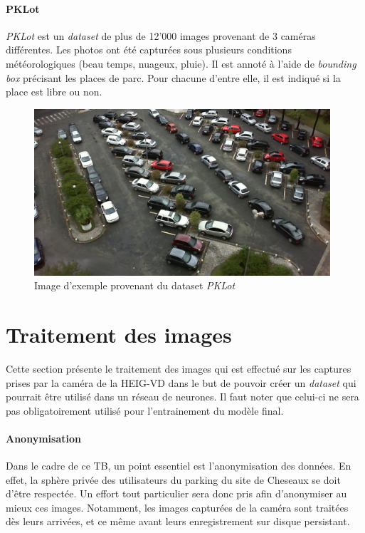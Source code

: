 \paragraph{PKLot}
\textit{PKLot} est un \textit{dataset} de plus de 12'000 images provenant de 3 caméras différentes. Les photos ont été capturées sous plusieurs conditions météorologiques (beau temps, nuageux, pluie). Il est annoté à l'aide de \textit{bounding box} précisant les places de parc. Pour chacune d'entre elle, il est indiqué si la place est libre ou non. 

\begin{figure}[ht]
    \includegraphics[width=110mm]{img/conception/pklot_park.jpg}
    \centering
    \caption{Image d'exemple provenant du dataset \textit{PKLot}}
\end{figure}

\section{Traitement des images}\label{conception.traitement}
Cette section présente le traitement des images qui est effectué sur les captures prises par la caméra de la HEIG-VD dans le but de pouvoir créer un \textit{dataset} qui pourrait être utilisé dans un réseau de neurones. Il faut noter que celui-ci ne sera pas obligatoirement utilisé pour l'entrainement du modèle final.

\paragraph{Anonymisation}
Dans le cadre de ce TB, un point essentiel est l'anonymisation des données. En effet, la sphère privée des utilisateurs du parking du site de Cheseaux se doit d'être respectée. Un effort tout particulier sera donc pris afin d'anonymiser au mieux ces images. Notamment, les images capturées de la caméra sont traitées dès leurs arrivées, et ce même avant leurs enregistrement sur disque persistant. 

